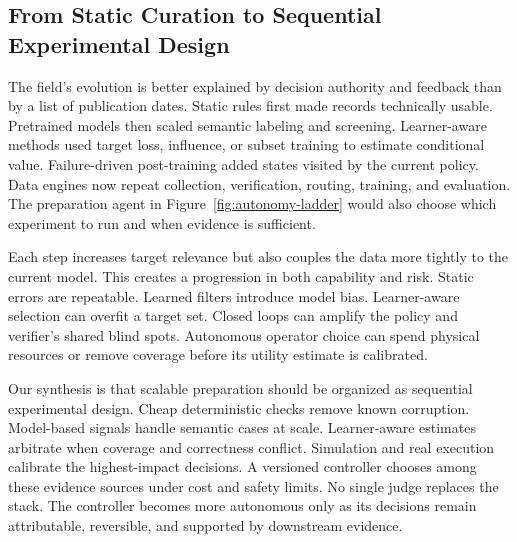 \subsection{From Static Curation to Sequential Experimental Design}

The field's evolution is better explained by decision authority and feedback than by a list of publication dates. Static rules first made records technically usable. Pretrained models then scaled semantic labeling and screening. Learner-aware methods used target loss, influence, or subset training to estimate conditional value. Failure-driven post-training added states visited by the current policy. Data engines now repeat collection, verification, routing, training, and evaluation. The preparation agent in Figure~\ref{fig:autonomy-ladder} would also choose which experiment to run and when evidence is sufficient.

Each step increases target relevance but also couples the data more tightly to the current model. This creates a progression in both capability and risk. Static errors are repeatable. Learned filters introduce model bias. Learner-aware selection can overfit a target set. Closed loops can amplify the policy and verifier's shared blind spots. Autonomous operator choice can spend physical resources or remove coverage before its utility estimate is calibrated.

Our synthesis is that scalable preparation should be organized as sequential experimental design. Cheap deterministic checks remove known corruption. Model-based signals handle semantic cases at scale. Learner-aware estimates arbitrate when coverage and correctness conflict. Simulation and real execution calibrate the highest-impact decisions. A versioned controller chooses among these evidence sources under cost and safety limits. No single judge replaces the stack. The controller becomes more autonomous only as its decisions remain attributable, reversible, and supported by downstream evidence.
